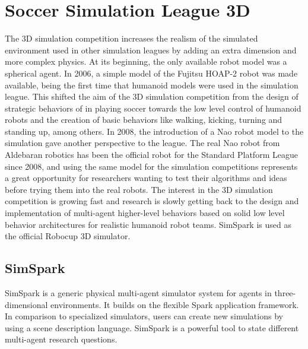 \chapter{Soccer Simulation League 3D}
\label{Soccer Simulation League 3D}
The 3D simulation competition increases the realism of the simulated environment used in other simulation leagues by adding an extra dimension and more complex physics. At its beginning, the only available robot model was a spherical agent. In 2006, a simple model of the Fujitsu HOAP-2 robot was made available, being the first time that humanoid models were used in the simulation league. This shifted the aim of the 3D simulation competition from the design of strategic behaviors of in playing soccer towards the low level control of humanoid robots and the creation of basic behaviors like walking, kicking, turning and standing up, among others.
In 2008, the introduction of a Nao robot model to the simulation gave another perspective to the league. The real Nao robot from Aldebaran robotics has been the official robot for the Standard Platform League since 2008, and using the same model for the simulation competitions represents a great opportunity for researchers wanting to test their algorithms and ideas before trying them into the real robots. The interest in the 3D simulation competition is growing fast and research is slowly getting back to the design and implementation of multi-agent higher-level behaviors based on solid low level behavior architectures for realistic humanoid robot teams. SimSpark is used as the official Robocup 3D simulator. \cite{SoccerSimulationLeague3D}
\section{SimSpark}
SimSpark is a generic physical multi-agent simulator system for agents in three-dimensional environments. It builds on the flexible Spark application framework. In comparison to specialized simulators, users can create new simulations by using a scene description language. SimSpark is a powerful tool to state different multi-agent research questions. \cite{SimSpark}
